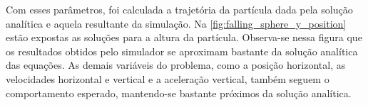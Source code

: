 
Com esses parâmetros, foi calculada a trajetória da partícula dada pela solução analítica e aquela resultante da simulação. Na \cref{fig:falling_sphere_y_position} estão expostas as soluções para a altura da partícula. Observa-se nessa figura que os resultados obtidos pelo simulador se aproximam bastante da solução analítica das equações. As demais variáveis do problema, como a posição horizontal, as velocidades horizontal e vertical e a aceleração vertical, também seguem o comportamento esperado, mantendo-se bastante próximos da solução analítica.

